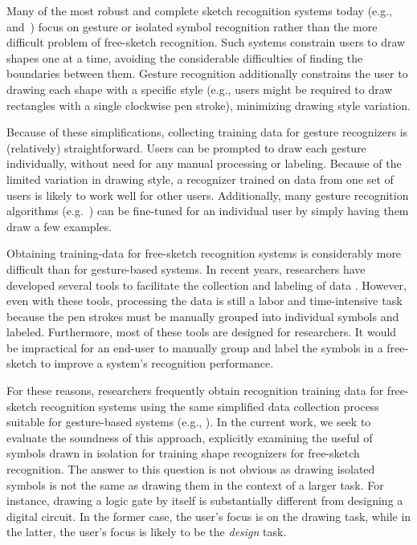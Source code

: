 \documentclass{egpubl}
\begin{document}
Many of the most robust and complete sketch recognition systems today
(e.g., \cite{Zeleznik2008Lineogrammer} and~\cite{Lee2008Newton}) focus
on gesture or isolated symbol recognition rather than the more
difficult problem of free-sketch recognition.  Such systems constrain
users to draw shapes one at a time, avoiding the considerable
difficulties of finding the boundaries between them.  Gesture
recognition additionally constrains the user to drawing each shape
with a specific style (e.g., users might be required to draw
rectangles with a single clockwise pen stroke), minimizing drawing
style variation.

Because of these simplifications, collecting training data for gesture
recognizers is (relatively) straightforward.  Users can be prompted to
draw each gesture individually, without need for any manual processing
or labeling.  Because of the limited variation in drawing style, a
recognizer trained on data from one set of users is likely to work
well for other users. Additionally, many gesture recognition
algorithms (e.g.~\cite{dollar}) can be fine-tuned for an individual
user by simply having them draw a few examples.

Obtaining training-data for free-sketch recognition systems is
considerably more difficult than for gesture-based systems. In recent
years, researchers have developed several tools to facilitate the
collection and labeling of data
\cite{Wolin2007Labeler,Paulson2008SOUSA,Blagojevic2008Data}.  However,
even with these tools, processing the data is still a labor and
time-intensive task because the pen strokes must be manually grouped
into individual symbols and labeled.  Furthermore, most of these tools
are designed for researchers. It would be impractical for an end-user
to manually group and label the symbols in a free-sketch to improve a
system's recognition performance.


For these reasons, researchers frequently obtain recognition training
data for free-sketch recognition systems using the same simplified
data collection process suitable for gesture-based systems (e.g.,
\cite{Kara2005ImageBased,Hse2004ssr}). In the current work, we seek to
evaluate the soundness of this approach, explicitly examining the useful
of symbols drawn in isolation for training shape recognizers for
free-sketch recognition.  The answer to this question is not obvious
as drawing isolated symbols is not the same as drawing them in the
context of a larger task. For instance, drawing a logic gate by itself
is substantially different from designing a digital circuit.  In the
former case, the user's focus is on the drawing task, while in the
latter, the user's focus is likely to be the \textit{design} task.
\end{document}
